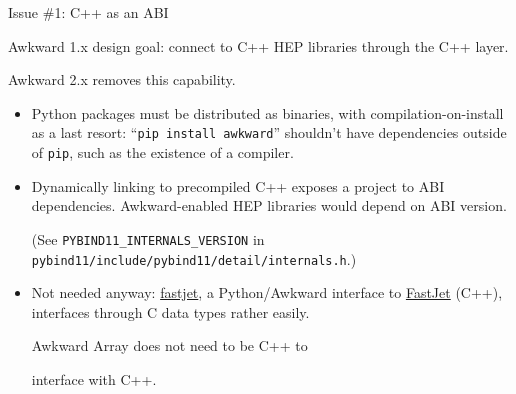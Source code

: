 \documentclass[aspectratio=169]{beamer}
\begin{document}
\begin{frame}{Issue \#1: C++ as an ABI}
\large

\vspace{0.5 cm}
Awkward 1.x design goal: connect to C++ HEP libraries through the C++ layer.

\vspace{0.25 cm}
Awkward 2.x removes this capability.

\vspace{0.25 cm}
\begin{itemize}\setlength{\itemsep}{0.25 cm}
\item<2-> Python packages must be distributed as binaries, with compilation-on-install as a last resort: ``\texttt{pip install awkward}'' shouldn't have dependencies outside of \texttt{pip}, such as the existence of a compiler.

\item<3-> Dynamically linking to precompiled C++ exposes a project to ABI dependencies. Awkward-enabled HEP libraries would depend on ABI version.

{\scriptsize (See \texttt{PYBIND11_INTERNALS_VERSION} in \texttt{pybind11/include/pybind11/detail/internals.h}.)}

\item<4-> Not needed anyway: \textcolor{blue}{\href{https://github.com/scikit-hep/fastjet}{fastjet}}, a Python/Awkward interface to \textcolor{blue}{\href{http://fastjet.fr/}{FastJet}} (C++), interfaces through C data types rather easily.

\vspace{0.25 cm}
Awkward Array does not need to be C++ to

interface with C++.
\end{itemize}

\vspace{-1.65 cm}
\hfill {}

\vspace{-0.15 cm}
\hfill {}
\end{frame}
\end{document}

